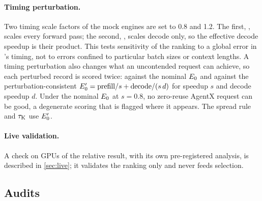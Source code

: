 \paragraph{Timing perturbation.}
Two timing scale factors of the mock engines are set to 0.8 and 1.2. The first,
, scales every forward pass; the second, ,
scales decode only, so the effective decode speedup is their product. This tests sensitivity of the ranking to a global error in \ais{}'s timing,
not to errors confined to particular batch sizes or context lengths. A timing perturbation also
changes what an uncontended request can achieve, so each perturbed record is scored twice: against
the nominal $E_0$ and against the perturbation-consistent
$E_0' = \text{prefill}/s + \text{decode}/(s\,d)$ for speedup $s$ and decode speedup $d$. Under the
nominal $E_0$ at $s = 0.8$, no zero-reuse AgentX request can be good, a degenerate scoring that is
flagged where it appears. The spread rule and $\tau_{\mathrm{K}}$ use $E_0'$.

\paragraph{Live validation.}
A check on GPUs of the relative result, with its own pre-registered analysis, is described in
\cref{sec:live}; it validates the ranking only and never feeds selection.

\subsection{Audits}
\label{sec:audits}

